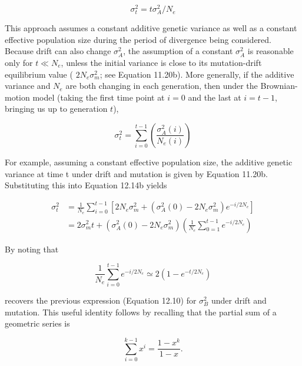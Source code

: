 \documentclass{article}
\begin{document}
\begin{equation}
\sigma_{t}^{2}=t\sigma_{A}^{2}/N_{e}
\tag{12.14a}
\label{eq:12_14a}
\end{equation}

This approach assumes a constant additive genetic variance as well as a constant effective population size during the period of divergence being considered. Because drift can also change  $ \sigma_A^2 $, the assumption of a constant  $ \sigma_A^2 $ is reasonable only for  $ t \ll N_e $, unless the initial variance is close to its mutation-drift equilibrium value ( $ 2N_e\sigma_m^2 $; see Equation 11.20b). More generally, if the additive variance and  $ N_e $ are both changing in each generation, then under the Brownian-motion model (taking the first time point at  $ i = 0 $ and the last at  $ i = t - 1 $, bringing us up to generation  $ t $),

\begin{equation}
\sigma_{t}^{2}=\sum_{i=0}^{t-1}\left(\frac{\sigma_{A}^{2}(i)}{N_{e}(i)}\right)
\tag{12.14b}
\label{eq:12_14b}
\end{equation}

For example, assuming a constant effective population size, the additive genetic variance at time t under drift and mutation is given by Equation 11.20b. Substituting this into Equation 12.14b yields

\begin{equation}
\begin{align*}\sigma_{t}^{2}&=\frac{1}{N_{e}}\sum_{i=0}^{t-1}\left[2N_{e}\sigma_{m}^{2}+\left(\sigma_{A}^{2}(0)-2N_{e}\sigma_{m}^{2}\right)e^{-i/2N_{e}}\right]\\&=2\sigma_{m}^{2}t+\left(\sigma_{A}^{2}(0)-2N_{e}\sigma_{m}^{2}\right)\left(\frac{1}{N_{e}}\sum_{0=1}^{t-1}e^{-i/2N_{e}}\right)\end{align*}
\tag{12.14c}
\label{eq:12_14c}
\end{equation}

By noting that

\begin{equation}
\frac{1}{N_{e}}\sum_{i=0}^{t-1}e^{-i/2N_{e}}\simeq2\left(1-e^{-t/2N_{e}}\right)
\tag{12.15a}
\label{eq:12_15a}
\end{equation}

recovers the previous expression (Equation 12.10) for  $ \sigma_{B}^{2} $ under drift and mutation. This useful identity follows by recalling that the partial sum of a geometric series is

\begin{equation}
\sum_{i=0}^{k-1}x^{i}=\frac{1-x^{k}}{1-x}.
\tag{12.15b}
\label{eq:12_15b}
\end{equation}
\end{document}
